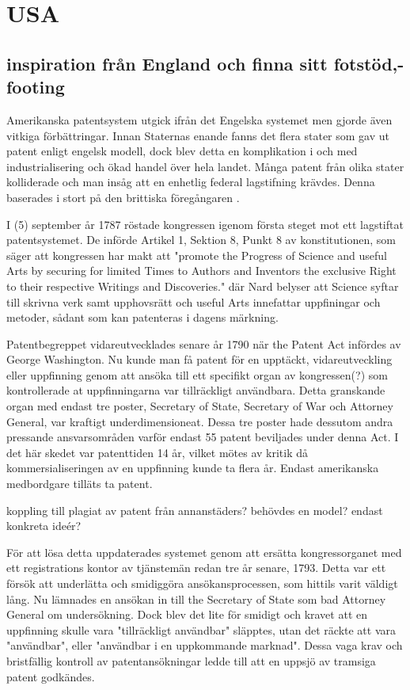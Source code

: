 \section{USA} %

\subsection{inspiration från England och finna sitt fotstöd,- footing} %
\label{sub:inspiration_från_england}

Amerikanska patentsystem utgick ifrån det Engelska systemet men gjorde även vitkiga förbättringar. Innan
Staternas enande fanns det flera stater som gav ut patent enligt engelsk modell, dock blev detta en
komplikation i och med industrialisering och ökad handel över hela landet. Många patent från olika stater
kolliderade och man insåg att en enhetlig federal lagstifning krävdes. Denna baserades i stort på den
brittiska föregångaren \cite{nard}.

I (5) september år 1787 röstade kongressen igenom första steget mot ett lagstiftat patentsystemet. De
införde Artikel 1, Sektion 8, Punkt 8 av konstitutionen, som säger att kongressen har makt att "promote
the Progress of Science and useful Arts by securing for limited Times to Authors and Inventors the
exclusive Right to their respective Writings and Discoveries." där Nard belyser att Science syftar till skrivna verk samt
upphovsrätt och useful Arts innefattar uppfiningar och metoder, sådant som kan patenteras i dagens märkning\cite{nard}.

Patentbegreppet vidareutvecklades senare år 1790 när the Patent Act infördes av George Washington. Nu kunde
man få patent för en upptäckt, vidareutveckling eller uppfinning genom att ansöka till ett specifikt organ
av kongressen(?) som kontrollerade at uppfinningarna var tillräckligt användbara\cite{nard}. Detta granskande organ med endast tre poster, Secretary of State, Secretary of War och Attorney
General, var kraftigt underdimensioneat. Dessa tre poster hade dessutom andra pressande ansvarsområden varför endast
55 patent beviljades under denna Act\cite{nard}. I det här skedet var patenttiden 14 år, vilket mötes av kritik då
kommersialiseringen av en uppfinning kunde ta flera år. Endast amerikanska medbordgare tilläts ta patent\cite{nard}.

koppling till plagiat av patent från annanstäders?
behövdes en model? endast konkreta ideér?

För att lösa detta uppdaterades systemet genom att ersätta kongressorganet med ett registrations kontor av
tjänstemän redan tre år senare, 1793. Detta var ett försök att underlätta och smidiggöra ansökansprocessen, som
hittils varit väldigt lång. Nu lämnades en ansökan in till the Secretary of State som bad Attorney General
om undersökning. Dock blev det lite för smidigt och kravet att en uppfinning skulle vara "tillräckligt
användbar" släpptes, utan det räckte att vara "användbar", eller "användbar i en uppkommande marknad".
Dessa vaga krav och bristfällig kontroll av patentansökningar ledde till att en uppsjö av tramsiga patent
godkändes\cite{nard}.

